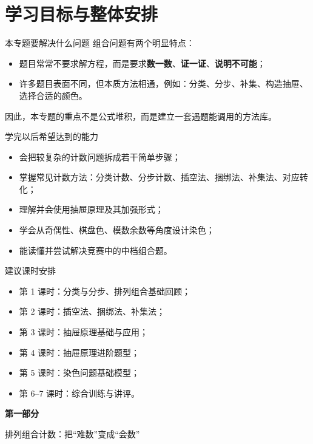 \documentclass[11pt,a4paper,fontset=fandol]{ctexart}
\theoremstyle{formaltheorem}
\theoremstyle{formalexample}
\newcommand{\partdivider}[2]{%
  \clearpage
  \thispagestyle{empty}
  \vspace*{\fill}
  \begin{center}
  \begin{tcolorbox}[
    enhanced,
    width=0.78\textwidth,
    colback=lightblue,
    colframe=mainblue,
    boxrule=0.9pt,
    arc=0mm,
    left=6mm,
    right=6mm,
    top=8mm,
    bottom=8mm
  ]
  \centering
  {\fontsize{24}{30}\selectfont\bfseries #1\par}
  \vspace{0.6cm}
  {\large #2\par}
  \end{tcolorbox}
  \end{center}
  \vspace*{\fill}
  \clearpage
}
\begin{document}
\pagestyle{plain}
\tableofcontents
\newpage
\pagestyle{fancy}

\section{学习目标与整体安排}

\begin{goalbox}{本专题要解决什么问题}
组合问题有两个明显特点：
\begin{itemize}
  \item 题目常常不要求解方程，而是要求\textbf{数一数}、\textbf{证一证}、\textbf{说明不可能}；
  \item 许多题目表面不同，但本质方法相通，例如：分类、分步、补集、构造抽屉、选择合适的颜色。
\end{itemize}
因此，本专题的重点不是公式堆积，而是建立一套遇题能调用的方法库。
\end{goalbox}

\begin{goalbox}{学完以后希望达到的能力}
\begin{itemize}
  \item 会把较复杂的计数问题拆成若干简单步骤；
  \item 掌握常见计数方法：分类计数、分步计数、插空法、捆绑法、补集法、对应转化；
  \item 理解并会使用抽屉原理及其加强形式；
  \item 学会从奇偶性、棋盘色、模数余数等角度设计染色；
  \item 能读懂并尝试解决竞赛中的中档组合题。
\end{itemize}
\end{goalbox}

\begin{notebox}{建议课时安排}
\begin{itemize}
  \item 第 1 课时：分类与分步、排列组合基础回顾；
  \item 第 2 课时：插空法、捆绑法、补集法；
  \item 第 3 课时：抽屉原理基础与应用；
  \item 第 4 课时：抽屉原理进阶题型；
  \item 第 5 课时：染色问题基础模型；
  \item 第 6--7 课时：综合训练与讲评。
\end{itemize}
\end{notebox}

\partdivider{第一部分}{排列组合计数：把“难数”变成“会数”}
\end{document}
